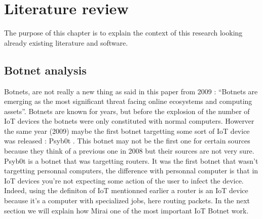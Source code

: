 \documentclass{report}
\begin{document}
\chapter{Literature review}
The purpose of this chapter is to explain the context of this research looking already existing literature and software.\newline
\newline

\section{Botnet analysis}
Botnets, are not really a new thing as said in this paper from 2009 \autocite{feily2009survey} : ``Botnets are emerging as the most significant threat facing online ecosystems and computing assets''. Botnets are known for years, but before the explosion of the number of IoT devices the botnets were only constituted with normal computers. Howerver the same year (2009) maybe the first botnet targetting some sort of IoT device was released : Psyb0t \autocite{durfina2013psybot}. This botnet may not be the first one for certain sources \autocite{angrishi2017turning} because they think of a previous one in 2008 but their sources are not very sure. Psyb0t is a botnet that was targetting routers. It was the first botnet that wasn't targetting personnal computers, the difference with personnal computer is that in IoT devices you're not expecting some action of the user to infect the device. Indeed, using the definiton of IoT mentionned earlier a router is an IoT device because it's a computer with specialized jobs, here routing packets.\newline
In the next section we will explain how Mirai one of the most important IoT Botnet work.
\end{document}
